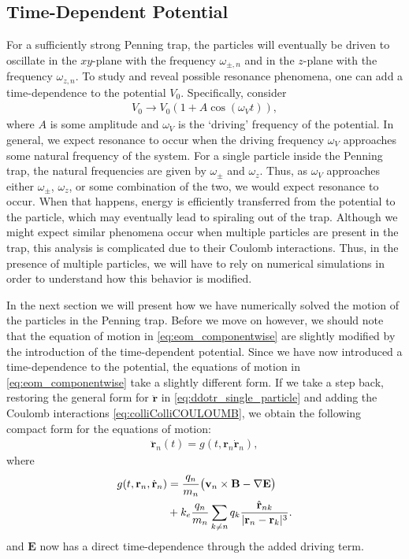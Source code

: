 \documentclass[english,notitlepage,reprint]{revtex4-2}  %
\renewcommand{\vec}[1]{\mathbf{#1}}
\begin{document}
\subsection{Time-Dependent Potential}\label{sec:time_dep_potential}
For a sufficiently strong Penning trap, the particles will eventually be driven to oscillate in the \(xy\)-plane with the frequency \(\omega_{\pm,n}\) and in the \(z\)-plane with the frequency \(\omega_{z,n}\). To study and reveal possible resonance phenomena, one can add a time-dependence to the potential \(V_0\). Specifically, consider
\begin{align}
    V_0\rightarrow V_0(1 + A\cos(\omega_V t)),
\end{align}
where \(A\) is some amplitude and \(\omega_V\) is the `driving' frequency of the potential. 
In general, we expect resonance to occur when the driving frequency \(\omega_V\) approaches some natural frequency of the system.\cite{uioFYS3150H25}
For a single particle inside the Penning trap, the natural frequencies are given by \(\omega_{\pm}\) and \(\omega_{z}\).
Thus, as \(\omega_V\) approaches either \(\omega_{\pm}\), \(\omega_{z}\), or some combination of the two, we would expect resonance to occur.
When that happens, energy is efficiently transferred from the potential to the particle, which may eventually lead to spiraling out of the trap.
Although we might expect similar phenomena occur when multiple particles are present in the trap, this analysis is complicated due to their Coulomb interactions.
Thus, in the presence of multiple particles, we will have to rely on numerical simulations in order to understand how this behavior is modified.

In the next section we will present how we have numerically solved the motion of the particles in the Penning trap. 
Before we move on however, we should note that the equation of motion in \eqref{eq:eom_componentwise} are slightly modified by the introduction of the time-dependent potential. 
Since we have now introduced a time-dependence to the potential, the equations of motion in \eqref{eq:eom_componentwise} take a slightly different form. If we take a step back, restoring the general form for \(\ddot{\vec{r}}\) in \eqref{eq:ddotr_single_particle} and adding the Coulomb interactions \eqref{eq:colliColliCOULOUMB}, we obtain the following compact form for the equations of motion:
\begin{align}
    \ddot{\vec{r}}_{n}(t) = g(t, \vec{r}_n \dot{\vec{r}}_n),    \label{eq:eqm_final}
\end{align}
where 
\begin{align}
    g(t, \vec{r}_n, \dot{\vec{r}}_n) &= \frac{q_{n}}{m_{n}}\big(\vec{v}_{n}\times \vec{B} 
    -\nabla \vec{E}\big) 
    \notag \\
    &+ k_e \frac{q_n}{m_n}\sum_{k\neq n}q_k\frac{\hat{\vec{r}}_{nk}}{|\vec{r}_{n} - \vec{r}_{k}|^3}. \label{eq:fi}
\end{align}
and \(\vec{E}\) now has a direct time-dependence through the added driving term.
\end{document}
